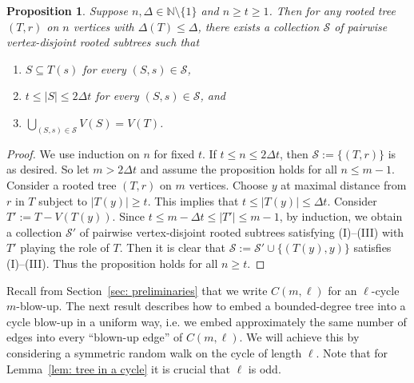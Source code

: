 \documentclass[a4paper, 11pt, reqno]{amsart}
\newtheorem{proposition}[definition]{Proposition}
\numberwithin{equation}{section}
\newcommand{\1}{{\rm 1\hspace*{-0.4ex}%
\rule{0.1ex}{1.52ex}\hspace*{0.2ex}}}
\newcommand{\N}{\mathbb N}
\newcommand{\cS}{\mathcal{S}}
\newcommand{\sm}{\setminus}
\begin{document}
\begin{proposition}\label{prop: tree decomp}
Suppose $n,\Delta \in \N\sm \{1\}$ and $n\geq t\geq 1$.
Then for any rooted tree $(T,r)$ on $n$ vertices with $\Delta(T)\leq \Delta$,
there exists a collection $\cS$ of pairwise vertex-disjoint rooted subtrees 
such that 
\begin{enumerate}[label=(\Roman*)]
	\item $S\subseteq T(s)$ for every $(S,s)\in \cS$,
	\item $t \leq |S|\leq 2\Delta t$ for every $(S,s)\in \cS$, and
	\item $\bigcup_{(S,s)\in\cS}V(S)=V(T)$.
\end{enumerate}
\end{proposition}
\begin{proof}
We use induction on $n$ for fixed $t$. 
If $t\leq n \leq 2\Delta t$, then $\cS:=\{ (T,r)\}$ is as desired. 
So let $m>2\Delta t$ and assume the proposition holds for all $n\leq m-1$. 
Consider a rooted tree $(T,r)$ on $m$ vertices.  
Choose $y$ at maximal distance from $r$ in $T$ subject to $|T(y)|\geq t$.
This implies that $t\leq |T(y)|\leq \Delta t$. 
Consider $T':= T- V(T(y))$. 
Since $t\leq m-\Delta t \leq |T'|\leq m-1$, 
by induction, we obtain a collection $\cS'$ of pairwise vertex-disjoint rooted subtrees satisfying (I)--(III) with $T'$ playing the role of $T$. 
Then it is clear that $\cS:=\cS'\cup \{(T(y),y)\}$ satisfies (I)--(III). 
Thus the proposition holds for all $n\geq t$.
\end{proof}

Recall from Section~\ref{sec: preliminaries} that we write $C(m,\ell)$ for an $\ell$-cycle $m$-blow-up. The next result describes how to embed a bounded-degree tree into a cycle blow-up in a uniform way, i.e. we embed approximately the same number of edges into every ``blown-up edge'' of $C(m,\ell)$. 
We will achieve this by considering a symmetric random walk on the cycle of length $\ell$.
Note that for Lemma~\ref{lem: tree in a cycle} it is crucial that $\ell$ is odd.
\end{document}
